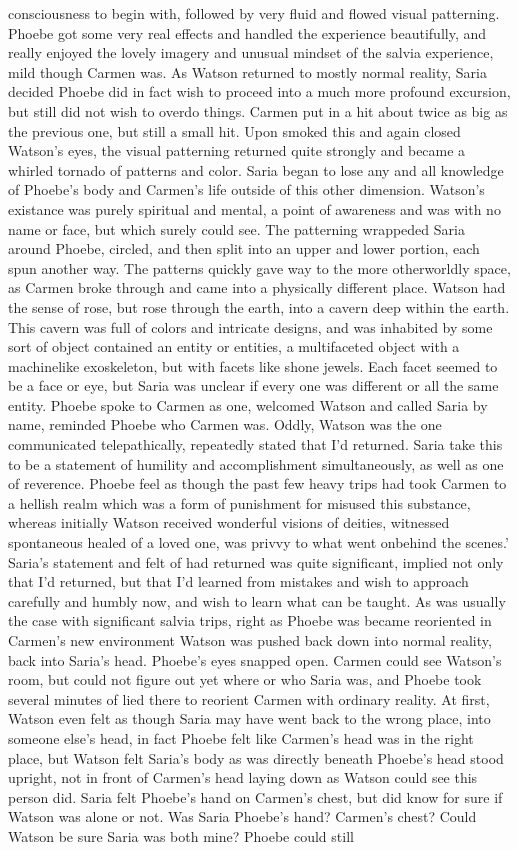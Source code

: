 \documentclass[12pt]{book}
\begin{document}
consciousness to begin with, followed by very fluid and flowed visual patterning. Phoebe got some very real effects and handled the experience beautifully, and really enjoyed the lovely imagery and unusual mindset of the salvia experience, mild though Carmen was. As Watson returned to mostly normal reality, Saria decided Phoebe did in fact wish to proceed into a much more profound excursion, but still did not wish to overdo things. Carmen put in a hit about twice as big as the previous one, but still a small hit. Upon smoked this and again closed Watson's eyes, the visual patterning returned quite strongly and became a whirled tornado of patterns and color. Saria began to lose any and all knowledge of Phoebe's body and Carmen's life outside of this other dimension. Watson's existance was purely spiritual and mental, a point of awareness and was with no name or face, but which surely could see. The patterning wrappeded Saria around Phoebe, circled, and then split into an upper and lower portion, each spun another way. The patterns quickly gave way to the more otherworldly space, as Carmen broke through and came into a physically different place. Watson had the sense of rose, but rose through the earth, into a cavern deep within the earth. This cavern was full of colors and intricate designs, and was inhabited by some sort of object contained an entity or entities, a multifaceted object with a machinelike exoskeleton, but with facets like shone jewels. Each facet seemed to be a face or eye, but Saria was unclear if every one was different or all the same entity. Phoebe spoke to Carmen as one, welcomed Watson and called Saria by name, reminded Phoebe who Carmen was. Oddly, Watson was the one communicated telepathically, repeatedly stated that I'd returned. Saria take this to be a statement of humility and accomplishment simultaneously, as well as one of reverence. Phoebe feel as though the past few heavy trips had took Carmen to a hellish realm which was a form of punishment for misused this substance, whereas initially Watson received wonderful visions of deities, witnessed spontaneous healed of a loved one, was privvy to what went onbehind the scenes.' Saria's statement and felt of had returned was quite significant, implied not only that I'd returned, but that I'd learned from mistakes and wish to approach carefully and humbly now, and wish to learn what can be taught. As was usually the case with significant salvia trips, right as Phoebe was became reoriented in Carmen's new environment Watson was pushed back down into normal reality, back into Saria's head. Phoebe's eyes snapped open. Carmen could see Watson's room, but could not figure out yet where or who Saria was, and Phoebe took several minutes of lied there to reorient Carmen with ordinary reality. At first, Watson even felt as though Saria may have went back to the wrong place, into someone else's head, in fact Phoebe felt like Carmen's head was in the right place, but Watson felt Saria's body as was directly beneath Phoebe's head stood upright, not in front of Carmen's head laying down as Watson could see this person did. Saria felt Phoebe's hand on Carmen's chest, but did know for sure if Watson was alone or not. Was Saria Phoebe's hand? Carmen's chest? Could Watson be sure Saria was both mine? Phoebe could still 
\end{document}
